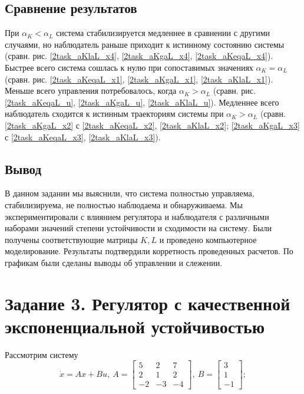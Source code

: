 \documentclass[a4paper, 12pt]{article}
\begin{document}
    
    \subsection{Сравнение результатов}
    При $\alpha_K<\alpha_L$ система стабилизируется медленнее в сравнении с другими случаями,
    но наблюдатель раньше приходит к истинному состоянию системы (сравн. рис. \ref{2task_aKlaL_x4}, \ref{2task_aKgaL_x4}, \ref{2task_aKeqaL_x4}).
    Быстрее всего система сошлась к нулю при сопоставимых значениях $\alpha_K=\alpha_L$ (сравн. рис. \ref{2task_aKeqaL_x1}, \ref{2task_aKgaL_x1}, \ref{2task_aKlaL_x1}). Меньше всего
    управления потребовалось, когда $\alpha_K>\alpha_L$ (сравн. рис. \ref{2task_aKeqaL_u}, \ref{2task_aKgaL_u}, \ref{2task_aKlaL_u}).
    Медленнее всего наблюдатель сходится к истинным траекториям системы при $\alpha_K>\alpha_L$ (сравн. \ref{2task_aKgaL_x2} с \ref{2task_aKeqaL_x2}, \ref{2task_aKlaL_x2}; \ref{2task_aKgaL_x3} с \ref{2task_aKeqaL_x3}, \ref{2task_aKlaL_x3}).


    \subsection{Вывод}
    В данном задании мы выяснили, что система полностью управляема, стабилизируема, не полностью наблюдаема и обнаруживаема.
    Мы экспериментировали с влиянием регулятора и наблюдателя с различными наборами значений степени устойчивости и сходимости на систему.
    Были получены соответствующие матрицы $K,L$ и проведено компьютерное моделирование. Результаты подтвердили корретность проведенных расчетов.
    По графикам были сделаны выводы об управлении и слежении.


    \section{Задание 3. Регулятор с качественной экспоненциальной устойчивостью}
    Рассмотрим систему
    $$
    \dot{x}=Ax+Bu,\ A=\begin{bmatrix}
        5 &2 &7\\
        2 &1 &2\\
        -2 &-3 &-4
    \end{bmatrix},\ B=\begin{bmatrix}
        3\\1\\-1
    \end{bmatrix};
    $$
\end{document}

